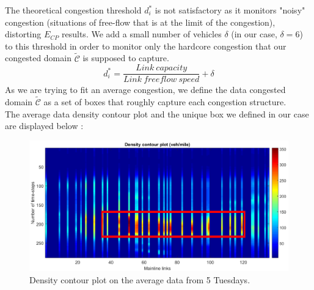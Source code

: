 The theoretical congestion threshold $d_{i}^{*}$ is not satisfactory as it monitors "noisy" congestion (situations of free-flow that is at the limit of the congestion), distorting $E_{CP}$ results. We add a small number of vehicles $\delta$ (in our case, $\delta=6$) to this threshold in order to monitor only the hardcore congestion that our congested domain $\widetilde{\mathscr{C}}$ is supposed to capture.
	\begin{equation*} 
		d_{i}^{*}=\frac{Link\ capacity}{Link\ freeflow\ speed}+\delta
	\end{equation*}
As we are trying to fit an average congestion, we define the data congested domain $\widetilde{\mathscr{C}}$ as a set of boxes that roughly capture each congestion structure.\\
The average data density contour plot and the unique box we defined in our case are displayed below :
\begin{figure}[h!]
	\centering
	\caption{Density contour plot on the average data from 5 Tuesdays.}
	\label{fig:pems_contour}
	\includegraphics[width=7in]{figures/PeMS_contour.png}
\end{figure}
